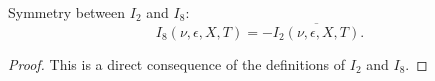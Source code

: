 \begin{lemma}[I8I2]
\label{I8I2}
\leanok
Symmetry between $I_2$ and $I_8$:
  $$
  I_8(\nu, \epsilon, X, T) = -\overline{I_2(\nu, \epsilon, X, T)}
  .
  $$
\end{lemma}
\begin{proof}
\leanok
This is a direct consequence of the definitions of $I_2$ and $I_8$.
\end{proof}
